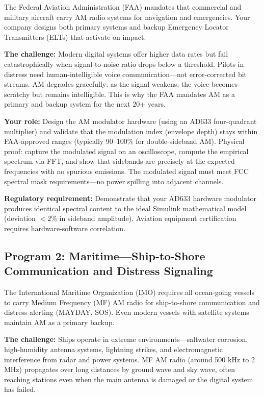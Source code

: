 \documentclass[11pt,letterpaper]{article}
\begin{document}
The Federal Aviation Administration (FAA) mandates that commercial and military aircraft carry AM radio systems for navigation and emergencies. Your company designs both primary systems and backup Emergency Locator Transmitters (ELTs) that activate on impact.

\textbf{The challenge:} Modern digital systems offer higher data rates but fail catastrophically when signal-to-noise ratio drops below a threshold. Pilots in distress need human-intelligible voice communication—not error-corrected bit streams. AM degrades gracefully: as the signal weakens, the voice becomes scratchy but remains intelligible. This is why the FAA mandates AM as a primary and backup system for the next 20+ years.

\textbf{Your role:} Design the AM modulator hardware (using an AD633 four-quadrant multiplier) and validate that the modulation index (envelope depth) stays within FAA-approved ranges (typically 90--100\% for double-sideband AM). Physical proof: capture the modulated signal on an oscilloscope, compute the empirical spectrum via FFT, and show that sidebands are precisely at the expected frequencies with no spurious emissions. The modulated signal must meet FCC spectral mask requirements—no power spilling into adjacent channels.

\textbf{Regulatory requirement:} Demonstrate that your AD633 hardware modulator produces identical spectral content to the ideal Simulink mathematical model (deviation $< 2\%$ in sideband amplitude). Aviation equipment certification requires hardware-software correlation.

\subsection{Program 2: Maritime—Ship-to-Shore Communication and Distress Signaling}

The International Maritime Organization (IMO) requires all ocean-going vessels to carry Medium Frequency (MF) AM radio for ship-to-shore communication and distress alerting (MAYDAY, SOS). Even modern vessels with satellite systems maintain AM as a primary backup.

\textbf{The challenge:} Ships operate in extreme environments—saltwater corrosion, high-humidity antenna systems, lightning strikes, and electromagnetic interference from radar and power systems. MF AM radio (around 500 kHz to 2 MHz) propagates over long distances by ground wave and sky wave, often reaching stations even when the main antenna is damaged or the digital system has failed.
\end{document}

